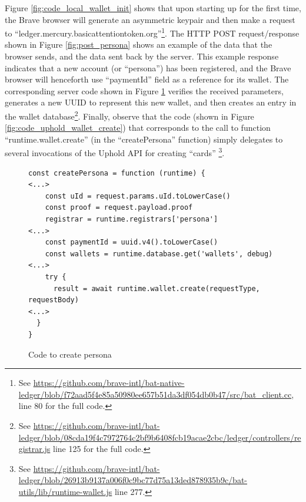 \documentclass[sigconf]{acmart}
\begin{document}
Figure \ref{fig:code_local_wallet_init} shows that
upon starting up for the first time, the Brave browser will generate
an asymmetric keypair and then make a request to
``ledger.mercury.basicattentiontoken.org''\footnote{See \url{https://github.com/brave-intl/bat-native-ledger/blob/f72aad5f4e85a50980ee657b51da3df054db0b47/src/bat_client.cc}, line 80 for the full code.}.
The HTTP POST request/response shown in Figure \ref{fig:post_persona}
shows an example of the data that the browser sends, and the
data sent back by the server. This example response indicates
that a new account (or ``persona'') has been registered,
and the Brave browser will henceforth use ``paymentId'' field
as a reference for its wallet. The corresponding server
code shown in Figure \ref{fig:code_uphold_persona_register}
verifies the received parameters, generates a new UUID
to represent this new wallet, and then creates an entry
in the wallet database\footnote{See
\url{https://github.com/brave-intl/bat-ledger/blob/08cda19f4c7972764c2bf9b6408fcb19acae2cbc/ledger/controllers/registrar.js} line 125 for the full code.}.
Finally, observe that the code (shown in Figure \ref{fig:code_uphold_wallet_create})
that corresponds
to the call to function ``runtime.wallet.create''
(in the ``createPersona'' function)
simply delegates to several invocations
of the Uphold API for creating ``cards''
\footnote{See \url{https://github.com/brave-intl/bat-ledger/blob/26913b9137a006f0c9bc77d75a13ded878935b9c/bat-utils/lib/runtime-wallet.js} line 277.}.

\begin{figure}
\begin{lstlisting}
const createPersona = function (runtime) {
<...>
    const uId = request.params.uId.toLowerCase()
    const proof = request.payload.proof
    registrar = runtime.registrars['persona']
<...>
    const paymentId = uuid.v4().toLowerCase()
    const wallets = runtime.database.get('wallets', debug)
<...>
    try {
      result = await runtime.wallet.create(requestType, requestBody)
<...>
  }
}
\end{lstlisting}
\caption{Code to create persona}
\label{fig:code_uphold_persona_register}
\end{figure}
\end{document}
